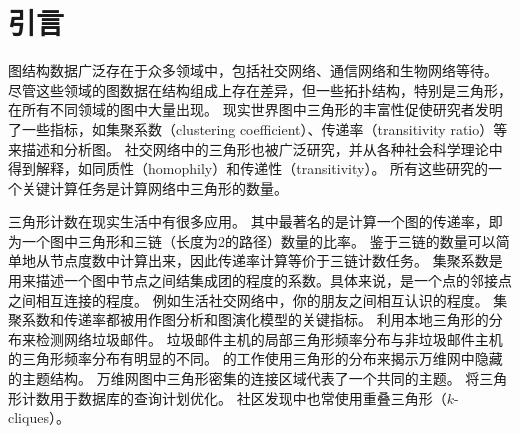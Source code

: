 



\chapter{引言}

图结构数据广泛存在于众多领域中，包括社交网络、通信网络和生物网络等待。
尽管这些领域的图数据在结构组成上存在差异，但一些拓扑结构，特别是三角形，在所有不同领域的图中大量出现。
现实世界图中三角形的丰富性促使研究者发明了一些指标，如集聚系数（clustering coefficient）\citep{watts1998collective}、传递率（transitivity ratio）\citep{holland1971transitivity}等来描述和分析图。
社交网络中的三角形也被广泛研究，并从各种社会科学理论中得到解释，如同质性（homophily）\citep{mcpherson2001birds}和传递性（transitivity）\citep{holland1971transitivity}。
所有这些研究的一个关键计算任务是计算网络中三角形的数量。

三角形计数在现实生活中有很多应用。
其中最著名的是计算一个图的传递率，即为一个图中三角形和三链（长度为2的路径）数量的比率。
鉴于三链的数量可以简单地从节点度数中计算出来，因此传递率计算等价于三链计数任务。
集聚系数是用来描述一个图中节点之间结集成团的程度的系数。具体来说，是一个点的邻接点之间相互连接的程度。
例如生活社交网络中，你的朋友之间相互认识的程度。
集聚系数和传递率都被用作图分析和图演化模型的关键指标\citep{aggarwal2014evolutionary}。
\cite{becchetti2008efficient}利用本地三角形的分布来检测网络垃圾邮件。
垃圾邮件主机的局部三角形频率分布与非垃圾邮件主机的三角形频率分布有明显的不同。
\cite{eckmann2002curvature}的工作使用三角形的分布来揭示万维网中隐藏的主题结构。
万维网图中三角形密集的连接区域代表了一个共同的主题。
\cite{bar2002reductions}将三角形计数用于数据库的查询计划优化。
社区发现中也常使用重叠三角形（$k$-cliques）\citep{palla2005uncovering}。

